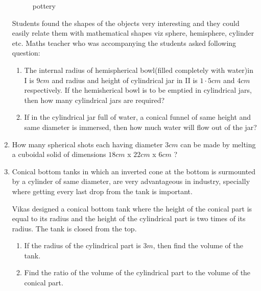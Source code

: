 \documentclass{article}
\begin{document}
\begin{enumerate}
\begin{figure}[H]
    \caption{pottery}
    \label{fig:pottery}
\end{figure}
Students found the shapes of the objects very interesting and they could easily relate them with mathematical shapes viz sphere, hemisphere, cylinder etc. Maths teacher who was accompanying the students asked following question:
\begin{enumerate}
    \item The internal radius of hemispherical bowl(filled completely with water)in I is $9cm$ and radius and height of cylindrical jar in II is $1\cdot5cm$ and $4cm$ respectively. If the hemisherical bowl is to be emptied in cylindrical jars, then how many cylindrical jars are required?
    \item If in the cylindrical jar full of water, a conical funnel of same height and same diameter is immersed, then how much water will flow out of the jar?
\end{enumerate}
\newpage
\item How many spherical shots each having diameter $3 cm$ can be made by melting a cuboidal solid of dimensions $18 cm$ x $22 cm$ x $6 cm$ ?
\item Conical bottom tanks in which an inverted cone at the bottom is surmounted by a cylinder of same diameter, are very advantageous in industry, specially where getting every last drop from the tank is important.

Vikas designed a conical bottom tank where the height of the conical part is equal to its radius and the height of the cylindrical part is two times of its radius. The tank is closed from the top.
\begin{enumerate}
    \item If the radius of the cylindrical part is $3 m$, then find the volume of the tank.
    \item Find the ratio of the volume of the cylindrical part to the volume of the conical part.
\end{enumerate}
              


    
\end{enumerate}
\end{document}
